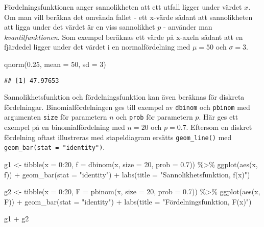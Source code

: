 \documentclass[
]{book}
\newenvironment{Shaded}{\begin{snugshade}}{\end{snugshade}}
\newcommand{\AttributeTok}[1]{\textcolor[rgb]{0.77,0.63,0.00}{#1}}
\newcommand{\DecValTok}[1]{\textcolor[rgb]{0.00,0.00,0.81}{#1}}
\newcommand{\FloatTok}[1]{\textcolor[rgb]{0.00,0.00,0.81}{#1}}
\newcommand{\FunctionTok}[1]{\textcolor[rgb]{0.00,0.00,0.00}{#1}}
\newcommand{\NormalTok}[1]{#1}
\newcommand{\OtherTok}[1]{\textcolor[rgb]{0.56,0.35,0.01}{#1}}
\newcommand{\SpecialCharTok}[1]{\textcolor[rgb]{0.00,0.00,0.00}{#1}}
\newcommand{\StringTok}[1]{\textcolor[rgb]{0.31,0.60,0.02}{#1}}
\theoremstyle{definition}
\theoremstyle{definition}
\theoremstyle{definition}
\theoremstyle{definition}
\theoremstyle{remark}
\begin{document}
Fördelningsfunktionen anger sannolikheten att ett utfall ligger under värdet \(x\). Om man vill beräkna det omvända fallet - ett x-värde sådant att sannolikheten att ligga under det värdet är en viss sannolikhet \(p\) - använder man \emph{kvantilfunktionen}. Som exempel beräknas ett värde på x-axeln sådant att en fjärdedel ligger under det värdet i en normalfördelning med \(\mu = 50\) och \(\sigma = 3\).

\begin{Shaded}
\begin{Highlighting}[]
\FunctionTok{qnorm}\NormalTok{(}\FloatTok{0.25}\NormalTok{, }\AttributeTok{mean =} \DecValTok{50}\NormalTok{, }\AttributeTok{sd =} \DecValTok{3}\NormalTok{)}
\end{Highlighting}
\end{Shaded}

\begin{verbatim}
## [1] 47.97653
\end{verbatim}

Sannolikhetsfunktion och fördelningsfunktion kan även beräknas för diskreta fördelningar. Binomialfördelningen ges till exempel av \texttt{dbinom} och \texttt{pbinom} med argumenten \texttt{size} för parametern \(n\) och \texttt{prob} för parametern \(p\). Här ges ett exempel på en binomialfördelning med \(n = 20\) och \(p = 0.7\). Eftersom en diskret fördelning oftast illustreras med stapeldiagram ersätts \texttt{geom\_line()} med \texttt{geom\_bar(stat\ =\ "identity")}.

\begin{Shaded}
\begin{Highlighting}[]
\NormalTok{g1 }\OtherTok{\textless{}{-}} \FunctionTok{tibble}\NormalTok{(}\AttributeTok{x =} \DecValTok{0}\SpecialCharTok{:}\DecValTok{20}\NormalTok{,}
             \AttributeTok{f =} \FunctionTok{dbinom}\NormalTok{(x, }\AttributeTok{size =} \DecValTok{20}\NormalTok{, }\AttributeTok{prob =} \FloatTok{0.7}\NormalTok{)) }\SpecialCharTok{\%\textgreater{}\%} 
  \FunctionTok{ggplot}\NormalTok{(}\FunctionTok{aes}\NormalTok{(x, f)) }\SpecialCharTok{+} 
  \FunctionTok{geom\_bar}\NormalTok{(}\AttributeTok{stat =} \StringTok{"identity"}\NormalTok{) }\SpecialCharTok{+}
  \FunctionTok{labs}\NormalTok{(}\AttributeTok{title =} \StringTok{"Sannolikhetsfunktion, f(x)"}\NormalTok{)}

\NormalTok{g2 }\OtherTok{\textless{}{-}} \FunctionTok{tibble}\NormalTok{(}\AttributeTok{x =} \DecValTok{0}\SpecialCharTok{:}\DecValTok{20}\NormalTok{,}
             \AttributeTok{F =} \FunctionTok{pbinom}\NormalTok{(x, }\AttributeTok{size =} \DecValTok{20}\NormalTok{, }\AttributeTok{prob =} \FloatTok{0.7}\NormalTok{)) }\SpecialCharTok{\%\textgreater{}\%} 
  \FunctionTok{ggplot}\NormalTok{(}\FunctionTok{aes}\NormalTok{(x, F)) }\SpecialCharTok{+} 
  \FunctionTok{geom\_bar}\NormalTok{(}\AttributeTok{stat =} \StringTok{"identity"}\NormalTok{) }\SpecialCharTok{+}
  \FunctionTok{labs}\NormalTok{(}\AttributeTok{title =} \StringTok{"Fördelningsfunktion, F(x)"}\NormalTok{)}

\NormalTok{g1 }\SpecialCharTok{+}\NormalTok{ g2}
\end{Highlighting}
\end{Shaded}
\end{document}
